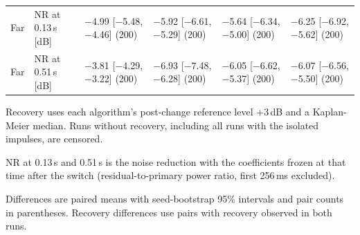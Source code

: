 \begin{table}[tbp]
{\begin{tabular}{llllll}
Far & NR at 0.13\,s [dB] & $-$4.99 [$-$5.48, $-$4.46] (200) & $-$5.92 [$-$6.61, $-$5.29] (200) & $-$5.64 [$-$6.34, $-$5.00] (200) & $-$6.25 [$-$6.92, $-$5.62] (200) \\
Far & NR at 0.51\,s [dB] & $-$3.81 [$-$4.29, $-$3.22] (200) & $-$6.93 [$-$7.48, $-$6.28] (200) & $-$6.05 [$-$6.62, $-$5.37] (200) & $-$6.07 [$-$6.56, $-$5.50] (200) \\
\bottomrule
\end{tabular}}
\par\medskip
\begin{minipage}{0.98\textwidth}
\footnotesize
Recovery uses each algorithm's post-change reference level +3\,dB and a Kaplan-Meier median. Runs without recovery, including all runs with the isolated impulses, are censored.\par
NR at 0.13\,s and 0.51\,s is the noise reduction with the coefficients frozen at that time after the switch (residual-to-primary power ratio, first 256\,ms excluded).\par
Differences are paired means with seed-bootstrap 95\% intervals and pair counts in parentheses. Recovery differences use pairs with recovery observed in both runs.\par
\end{minipage}
\end{table}

